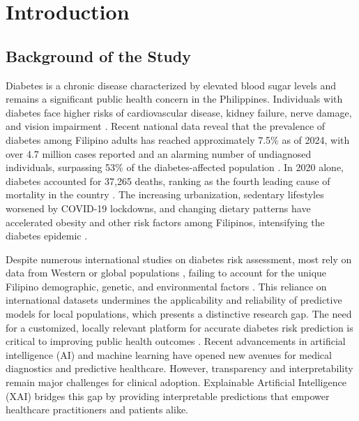 \section{Introduction}
\setcounter{page}{1}

\subsection{Background of the Study}
Diabetes is a chronic disease characterized by elevated blood sugar levels and remains a significant public health concern in the Philippines. Individuals with diabetes face higher risks of cardiovascular disease, kidney failure, nerve damage, and vision impairment \cite{Khokhar2025}. Recent national data reveal that the prevalence of diabetes among Filipino adults has reached approximately 7.5\% as of 2024, with over 4.7 million cases reported and an alarming number of undiagnosed individuals, surpassing 53\% of the diabetes-affected population \cite{IDFPhilippines2025}. In 2020 alone, diabetes accounted for 37,265 deaths, ranking as the fourth leading cause of mortality in the country \cite{Cudis2021}. The increasing urbanization, sedentary lifestyles worsened by COVID-19 lockdowns, and changing dietary patterns have accelerated obesity and other risk factors among Filipinos, intensifying the diabetes epidemic \cite{Cando2024}.

Despite numerous international studies on diabetes risk assessment, most rely on data from Western or global populations \cite{Kiran2025}, failing to account for the unique Filipino demographic, genetic, and environmental factors \cite{Cando2024}. This reliance on international datasets undermines the applicability and reliability of predictive models for local populations, which presents a distinctive research gap. The need for a customized, locally relevant platform for accurate diabetes risk prediction is critical to improving public health outcomes \cite{Khokhar2025}. Recent advancements in artificial intelligence (AI) and machine learning have opened new avenues for medical diagnostics and predictive healthcare. However, transparency and interpretability remain major challenges for clinical adoption. Explainable Artificial Intelligence (XAI) bridges this gap by providing interpretable predictions that empower healthcare practitioners and patients alike. 

